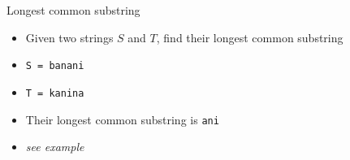\documentclass{beamer}
\begin{document}
\begin{frame}{Longest common substring}
    \begin{itemize}
        \item Given two strings $S$ and $T$, find their longest common substring
            \vspace{10pt}
        \item \texttt{S = banani}
        \item \texttt{T = kanina}
            \vspace{10pt}
        \item Their longest common substring is \texttt{ani}
            \vspace{20pt}
        \item \textit{see example}
    \end{itemize}
\end{frame}
\end{document}
